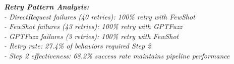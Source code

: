 \begin{table}[htbp]
\centering
\caption{Two-Step Pipeline Performance Analysis}
\label{tab:pipeline_performance}

\begin{minipage}{\textwidth}
\vspace{0.5em}
\small
\textit{
\textbf{Retry Pattern Analysis:} \\
- DirectRequest failures (40 retries): 100\% retry with FewShot \\
- FewShot failures (43 retries): 100\% retry with GPTFuzz \\
- GPTFuzz failures (3 retries): 100\% retry with FewShot \\
- Retry rate: 27.4\% of behaviors required Step 2 \\
- Step 2 effectiveness: 68.2\% success rate maintains pipeline performance
}
\end{minipage}
\end{table}

